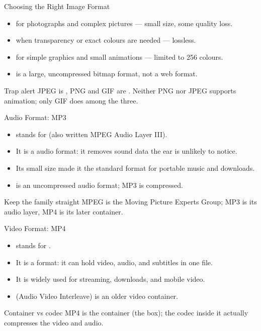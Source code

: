 \documentclass[aspectratio=169]{beamer}
\begin{document}
\begin{frame}{Choosing the Right Image Format}
  \begin{itemize}
    \item {} for photographs and complex pictures --- small size,
      some quality loss.
    \item {} when transparency or exact colours are needed --- lossless.
    \item {} for simple graphics and small animations --- limited to
      256 colours.
    \item {} is a large, uncompressed bitmap format, not a web format.
  \end{itemize}
  \begin{alertblock}{Trap alert}
    JPEG is , PNG and GIF are . Neither PNG nor JPEG
    supports animation; only GIF does among the three.
  \end{alertblock}
\end{frame}

\begin{frame}{Audio Format: MP3}
  \begin{itemize}
    \item {} stands for  (also written
      MPEG Audio Layer III).
    \item It is a  audio format: it removes sound data the ear is
      unlikely to notice.
    \item Its small size made it the standard format for portable music and
      downloads.
    \item {} is an uncompressed audio format; MP3 is compressed.
  \end{itemize}
  \begin{block}{Keep the family straight}
    MPEG is the Moving Picture Experts Group; MP3 is its audio layer, MP4 is
    its later container.
  \end{block}
\end{frame}

\begin{frame}{Video Format: MP4}
  \begin{itemize}
    \item {} stands for .
    \item It is a  format: it can hold video, audio, and
      subtitles in one file.
    \item It is widely used for streaming, downloads, and mobile video.
    \item {} (Audio Video Interleave) is an older video container.
  \end{itemize}
  \begin{block}{Container vs codec}
    MP4 is the container (the box); the codec inside it actually compresses
    the video and audio.
  \end{block}
\end{frame}
\end{document}

